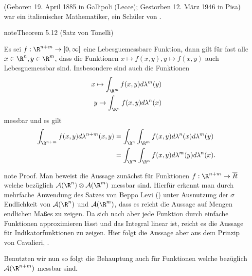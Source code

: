 \documentclass[letterpaper,10pt,german]{jupyterBook}
\begin{document}
\begin{sphinxShadowBox}

\sphinxAtStartPar
{} (Geboren 19. April 1885 in Gallipoli (Lecce); Gestorben 12. März 1946 in Pisa) war ein italienischer Mathematiker, ein Schüler von .
\end{sphinxShadowBox}
\label{masstheorie/integrationstechnik:thm:tonelli}
\begin{sphinxadmonition}{note}{Theorem 5.12 (Satz von Tonelli)}



\sphinxAtStartPar
Es sei \(f:\R^{n+m}\to [0,\infty]\) eine Lebesgue\sphinxhyphen{}messbare Funktion, dann gilt für fast alle \(x\in\R^n,y\in\R^m\), dass die Funktionen \(x\mapsto f(x,y), y\mapsto f(x,y)\) auch Lebesgue\sphinxhyphen{}messbar sind. Insbesondere sind auch die Funktionen
\begin{equation*}
\begin{split}x \mapsto \int_{\R^m} f(x,y) d\lambda^m(y)\\
y \mapsto \int_{\R^n} f(x,y) d\lambda^n(x)\end{split}
\end{equation*}
\sphinxAtStartPar
messbar und es gilt
\begin{equation*}
\begin{split}\int_{\R^{n+m}} f(x,y) d\lambda^{n+m}(x,y) &= \int_{\R^n}\int_{\R^m} f(x,y) d\lambda^{n}(x)d\lambda^m(y)\\
&=
\int_{\R^m}\int_{\R^n} f(x,y) d\lambda^{m}(y)d\lambda^n(x).\end{split}
\end{equation*}\end{sphinxadmonition}

\begin{sphinxadmonition}{note}
\sphinxAtStartPar
Proof. Man beweist die Aussage zunächst für Funktionen \(f:\R^{n+m}\to\overline{R}\) welche bezüglich \(\mathcal{A}(\R^n)\otimes\mathcal{A}(\R^m)\) messbar sind. Hierfür erkennt man durch mehrfache Anwendung des Satzes von Beppo Levi ({\hyperref[\detokenize{masstheorie/lebesgue_integral:lem:levi}]{}}) unter Ausnutzung der \(\sigma\)\sphinxhyphen{}Endlichkeit von \(\mathcal{A}(\R^n)\) und \(\mathcal{A}(\R^m)\), dass es reicht die Aussage auf Mengen endlichen Maßes zu zeigen. Da sich nach {\hyperref[\detokenize{masstheorie/lebesgue_integral:lem:simplefun}]{}} aber jede Funktion durch einfache Funktionen approximieren lässt und das Integral linear ist, reicht es die Aussage für Indikatorfunktionen zu zeigen. Hier folgt die Aussage aber aus dem Prinzip von Cavalieri, {\hyperref[\detokenize{masstheorie/integrationstechnik:thm:cavalieri}]{}}.

\sphinxAtStartPar
Benutzten wir nun {\hyperref[\detokenize{masstheorie/integrationstechnik:cor:zeroprodset}]{}} so folgt die Behauptung auch für Funktionen welche bezüglich \(\mathcal{A}(\R^{n+m})\) messbar sind.
\end{sphinxadmonition}
\end{document}
